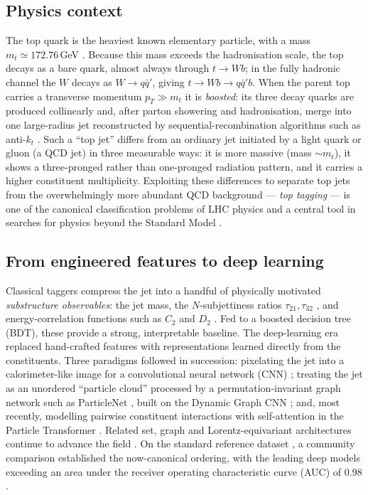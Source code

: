 \documentclass[preprint,12pt]{elsarticle}
\begin{document}
\subsection{Physics context}
The top quark is the heaviest known elementary particle, with a mass
$m_t\simeq172.76$\,GeV \citep{pdg2022}. Because this mass exceeds the
hadronisation scale, the top decays as a bare quark, almost always through
$t\rightarrow Wb$; in the fully hadronic channel the $W$ decays as
$W\rightarrow q\bar{q}'$, giving $t\rightarrow Wb\rightarrow q\bar{q}'b$. When
the parent top carries a transverse momentum $p_T\gg m_t$ it is
\emph{boosted}: its three decay quarks are produced collinearly and, after
parton showering and hadronisation, merge into one large-radius jet
reconstructed by sequential-recombination algorithms such as anti-$k_t$
\citep{cacciari2008,cacciari2012fastjet,salam2010}. Such a ``top jet'' differs
from an ordinary jet initiated by a light quark or gluon (a QCD jet) in three
measurable ways: it is more massive (mass $\sim m_t$), it shows a
three-pronged rather than one-pronged radiation pattern, and it carries a
higher constituent multiplicity. Exploiting these differences to separate top
jets from the overwhelmingly more abundant QCD background --- \emph{top
tagging} --- is one of the canonical classification problems of LHC physics
and a central tool in searches for physics beyond the Standard Model
\citep{larkoski2020,kogler2019}.

\subsection{From engineered features to deep learning}
Classical taggers compress the jet into a handful of physically motivated
\emph{substructure observables}: the jet mass, the $N$-subjettiness ratios
$\tau_{21},\tau_{32}$ \citep{thaler2011}, and energy-correlation functions
such as $C_2$ and $D_2$ \citep{larkoski2013,larkoski2014}. Fed to a
boosted decision tree (BDT), these provide a strong, interpretable baseline.
The deep-learning era replaced hand-crafted features with representations
learned directly from the constituents. Three paradigms followed in
succession: pixelating the jet into a calorimeter-like image for a
convolutional neural network (CNN) \citep{deoliveira2016,komiske2017};
treating the jet as an unordered ``particle cloud'' processed by a
permutation-invariant graph network such as ParticleNet
\citep{qu2020particlenet}, built on the Dynamic Graph CNN \citep{wang2019dgcnn};
and, most recently, modelling pairwise constituent interactions with
self-attention in the Particle Transformer
\citep{qu2022particletransformer,vaswani2017attention}. Related set, graph and
Lorentz-equivariant architectures continue to advance the field
\citep{komiske2019efn,moreno2020jedinet,bogatskiy2020lorentz,gong2022lorentznet}.
On the standard reference dataset \citep{kasieczka2019dataset}, a community
comparison \citep{kasieczka2019landscape} established the now-canonical
ordering, with the leading deep models exceeding an area under the receiver
operating characteristic curve (AUC) of $0.98$.
\end{document}
